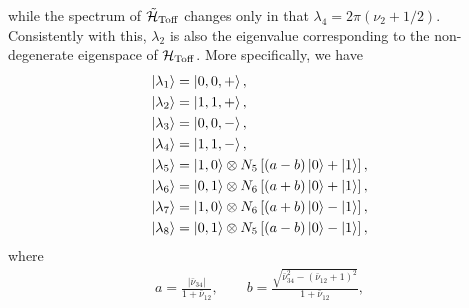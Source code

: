 while the spectrum of $\tilde{\mathcal{H}}_{\operatorname{Toff}}$ changes only in that
$\lambda_4 = 2\pi(\nu_2 + 1/2)$.
Consistently with this, $\lambda_2$ is also the eigenvalue corresponding to the non-degenerate eigenspace of $\mathcal{H}_{\operatorname{Toff}}$.
More specifically, we have
\begin{equation}
\begin{aligned}
	\ket{\lambda_1} &= \ket{0, 0, +}, \\
	\ket{\lambda_2} &= \ket{1, 1, +}, \\
	\ket{\lambda_3} &= \ket{0, 0, -}, \\
	\ket{\lambda_4} &= \ket{1, 1, -}, \\
	\ket{\lambda_5} &= \ket{1, 0} \otimes N_5\left[(a - b) \ket0 + \ket1 \right], \\
	\ket{\lambda_6} &= \ket{0, 1} \otimes N_6\left[(a + b) \ket0 + \ket1 \right], \\
	\ket{\lambda_7} &= \ket{1, 0} \otimes N_6\left[(a + b) \ket0 - \ket1 \right], \\
	\ket{\lambda_8} &= \ket{0, 1} \otimes N_5\left[(a - b) \ket0 - \ket1 \right],
\end{aligned}
\label{eq:toffoli_eigenvectors_solution}
\end{equation}
where
\begin{equation}
\newcommand{\denom}{1 + \bar\nu_{12}}
\begin{gathered}
	a = \frac{\lvert\bar\nu_{34}\rvert}{\denom{}},
	\qquad
	b = \frac{\sqrt{\bar\nu_{34}^2 - (\bar\nu_{12} + 1)^2}}{\denom{}},
\end{gathered}
\end{equation}
